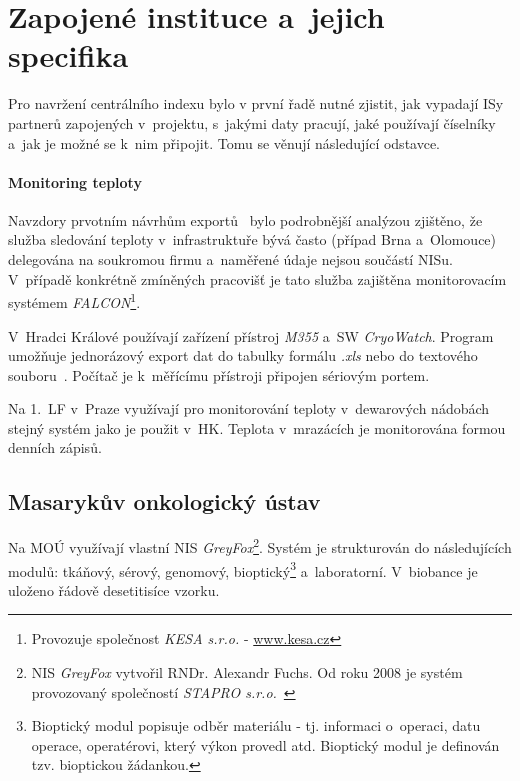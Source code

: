 \documentclass[11pt,draft,oneside]{fithesis2}
\begin{document}
\section{Zapojené instituce a~jejich specifika}\label{sec:instituce}
Pro navržení centrálního indexu bylo v první řadě nutné zjistit, jak vypadají ISy partnerů zapojených v~projektu, s~jakými daty pracují, jaké používají číselníky a~jak je možné se k~nim připojit. Tomu se věnují následující odstavce.

\paragraph*{Monitoring teploty}
Navzdory prvotním návrhům exportů~\cite{ARCH_2011_12_29} bylo podrobnější analýzou zjištěno, že služba sledování teploty v~infrastruktuře bývá často (případ Brna a~Olomouce) delegována na soukromou firmu a~naměřené údaje nejsou součástí NISu. V~případě konkrétně zmíněných pracovišť je tato služba zajištěna monitorovacím systémem \textit{FALCON}\footnote{Provozuje společnost \textit{KESA s.r.o.} - \url{www.kesa.cz}}.

V~Hradci Králové používají zařízení přístroj \textit{M355} a~SW \textit{CryoWatch}. Program umožňuje jednorázový export dat do tabulky formálu \textit{.xls} nebo do textového souboru~\cite{M355CE}.
Počítač je k~měřícímu přístroji připojen sériovým portem.

Na 1.~LF v~Praze využívají pro monitorování teploty v~dewarových nádobách stejný systém jako je použit v~HK. Teplota v~mrazácích je monitorována formou denních zápisů.

\subsection{Masarykův onkologický ústav}
Na MOÚ využívají vlastní NIS \textit{GreyFox}\footnote{NIS \textit{GreyFox} vytvořil RNDr. Alexandr Fuchs. Od roku 2008 je systém provozovaný společností \textit{STAPRO s.r.o.}~\cite{GreyFox}}. Systém je strukturován do následujících modulů: tkáňový, sérový, genomový, bioptický\footnote{Bioptický modul popisuje odběr materiálu - tj. informaci o~operaci, datu operace, operatérovi, který výkon provedl atd. Bioptický modul je definován tzv. bioptickou žádankou.} a~laboratorní. V~biobance je uloženo řádově desetitisíce vzorku.
\end{document}
